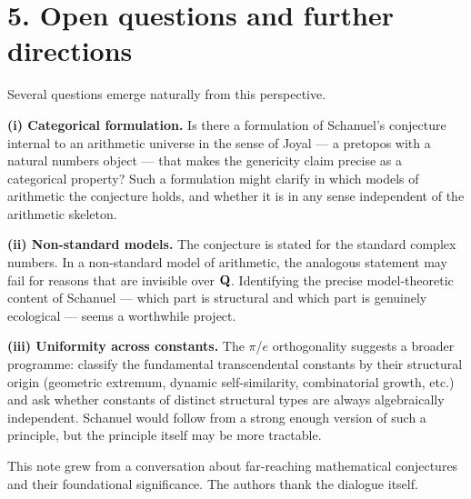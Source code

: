 \section{5. Open questions and further directions}

Several questions emerge naturally from this perspective.

\medskip\noindent
{\bf (i) Categorical formulation.} Is there a formulation of Schanuel's
conjecture internal to an arithmetic universe in the sense of Joyal --- a
pretopos with a natural numbers object --- that makes the genericity claim
precise as a categorical property? Such a formulation might clarify in which
models of arithmetic the conjecture holds, and whether it is in any sense
independent of the arithmetic skeleton.

\medskip\noindent
{\bf (ii) Non-standard models.} The conjecture is stated for the standard
complex numbers. In a non-standard model of arithmetic, the analogous statement
may fail for reasons that are invisible over ${\bf Q}$. Identifying the precise
model-theoretic content of Schanuel --- which part is structural and which part
is genuinely ecological --- seems a worthwhile project.

\medskip\noindent
{\bf (iii) Uniformity across constants.} The $\pi$/$e$ orthogonality suggests a
broader programme: classify the fundamental transcendental constants by their
structural origin (geometric extremum, dynamic self-similarity, combinatorial
growth, etc.) and ask whether constants of distinct structural types are always
algebraically independent. Schanuel would follow from a strong enough version
of such a principle, but the principle itself may be more tractable.

\bigskip
{} This note grew from a conversation
about far-reaching mathematical conjectures and their foundational significance.
The authors thank the dialogue itself.

\vfill\eject
\bye
